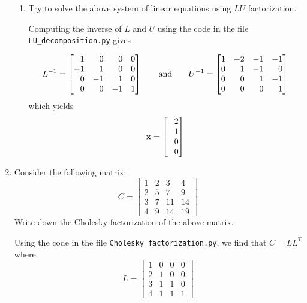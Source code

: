\documentclass[11pt,oneside,english,reqno]{amsart}
\theoremstyle{definition}
\newcommand{\aspace}{\hspace{7mm}\text{and}\hspace{7mm}}
\newcommand{\1}{\mathbbm{1}}
\begin{document}
\begin{enumerate}[leftmargin=*]
\begin{enumerate}
\item Try to solve the above system of linear equations using $LU$ factorization.

Computing the inverse of $L$ and $U$ using the code in the file \verb!LU_decomposition.py! gives

\begin{equation}
L^{-1} = \begin{bmatrix*}[r]1 & 0 & 0 & 0 \\ -1 & 1 & 0 & 0 \\ 0 & -1 & 1 & 0 \\ 0 & 0 & -1 & 1\end{bmatrix*}
\aspace U^{-1}=\begin{bmatrix*}[r]1 & -2 & -1 & -1 \\ 0 & 1 & -1 & 0 \\ 0 & 0 & 1 & -1 \\ 0 & 0 & 0 & 1\end{bmatrix*}
\end{equation}
which yields
\begin{equation}
{\bf x} = \begin{bmatrix*}[r]-2 \\ 1\\ 0\\ 0\end{bmatrix*}
\end{equation}
\end{enumerate}

\item Consider the following matrix:
\begin{equation}
C=\begin{bmatrix}1 & 2 & 3 & 4 \\ 2 & 5 & 7 & 9 \\ 3 & 7 & 11 & 14 \\ 4 & 9 & 14 & 19 \end{bmatrix}
\end{equation}
Write down the Cholesky factorization of the above matrix.

Using the code in the file \verb!Cholesky_factorization.py!, we find that $C=LL^T$ where
\begin{equation}
L=\begin{bmatrix}1 & 0 & 0 & 0 \\ 2 & 1 & 0 & 0 \\ 3 & 1 & 1 & 0 \\ 4 & 1 & 1 & 1\end{bmatrix}
\end{equation}



\end{enumerate}
\end{document}

